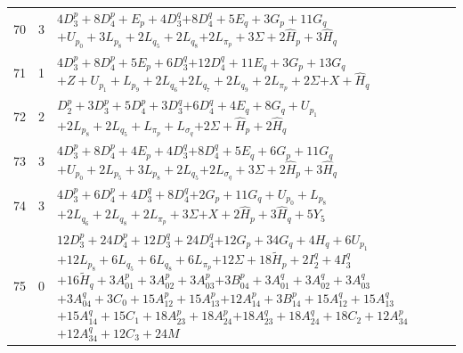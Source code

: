 \documentclass[11pt,a4paper]{article}
\theoremstyle{remark}
\begin{document}
\begin{longtable}{rrp{12.7cm}}
70&3&\( 4D_3^p + 8D_4^p + E_p + 4D_3^q \)\newline\( + 8D_4^q + 5E_q + 3G_p + 11G_q \)\newline\( + U_{p_{0}} + 3L_{p_{8}} + 2L_{q_{5}} + 2L_{q_{8}} \)\newline\( + 2L_{\pi_p} + 3\Sigma + 2\widehat H_p + 3\widehat H_q \)\\[3pt]
71&1&\( 4D_3^p + 8D_4^p + 5E_p + 6D_3^q \)\newline\( + 12D_4^q + 11E_q + 3G_p + 13G_q \)\newline\( + Z + U_{p_{1}} + L_{p_{9}} + 2L_{q_{6}} \)\newline\( + 2L_{q_{7}} + 2L_{q_{9}} + 2L_{\pi_p} + 2\Sigma \)\newline\( + X + \widehat H_q \)\\[3pt]
72&2&\( D_2^p + 3D_3^p + 5D_4^p + 3D_3^q \)\newline\( + 6D_4^q + 4E_q + 8G_q + U_{p_{1}} \)\newline\( + 2L_{p_{8}} + 2L_{q_{5}} + L_{\pi_p} + L_{\sigma_q} \)\newline\( + 2\Sigma + \widehat H_p + 2\widehat H_q \)\\[3pt]
73&3&\( 4D_3^p + 8D_4^p + 4E_p + 4D_3^q \)\newline\( + 8D_4^q + 5E_q + 6G_p + 11G_q \)\newline\( + U_{p_{0}} + 2L_{p_{5}} + 3L_{p_{8}} + 2L_{q_{5}} \)\newline\( + 2L_{\sigma_q} + 3\Sigma + 2\widehat H_p + 3\widehat H_q \)\\[3pt]
74&3&\( 4D_3^p + 6D_4^p + 4D_3^q + 8D_4^q \)\newline\( + 2G_p + 11G_q + U_{p_{0}} + L_{p_{8}} \)\newline\( + 2L_{q_{6}} + 2L_{q_{8}} + 2L_{\pi_p} + 3\Sigma \)\newline\( + X + 2\widehat H_p + 3\widehat H_q + 5Y_5 \)\\[3pt]
75&0&\( 12D_3^p + 24D_4^p + 12D_3^q + 24D_4^q \)\newline\( + 12G_p + 34G_q + 4H_q + 6U_{p_{1}} \)\newline\( + 12L_{p_{8}} + 6L_{q_{5}} + 6L_{q_{8}} + 6L_{\pi_p} \)\newline\( + 12\Sigma + 18\widetilde H_p + 2I_2^q + 4I_3^q \)\newline\( + 16\widetilde H_q + 3A_{01}^p + 3A_{02}^p + 3A_{03}^p \)\newline\( + 3B_{04}^p + 3A_{01}^q + 3A_{02}^q + 3A_{03}^q \)\newline\( + 3A_{04}^q + 3C_0 + 15A_{12}^p + 15A_{13}^p \)\newline\( + 12A_{14}^p + 3B_{14}^p + 15A_{12}^q + 15A_{13}^q \)\newline\( + 15A_{14}^q + 15C_1 + 18A_{23}^p + 18A_{24}^p \)\newline\( + 18A_{23}^q + 18A_{24}^q + 18C_2 + 12A_{34}^p \)\newline\( + 12A_{34}^q + 12C_3 + 24M \)\\[3pt]

\end{longtable}
\end{document}
